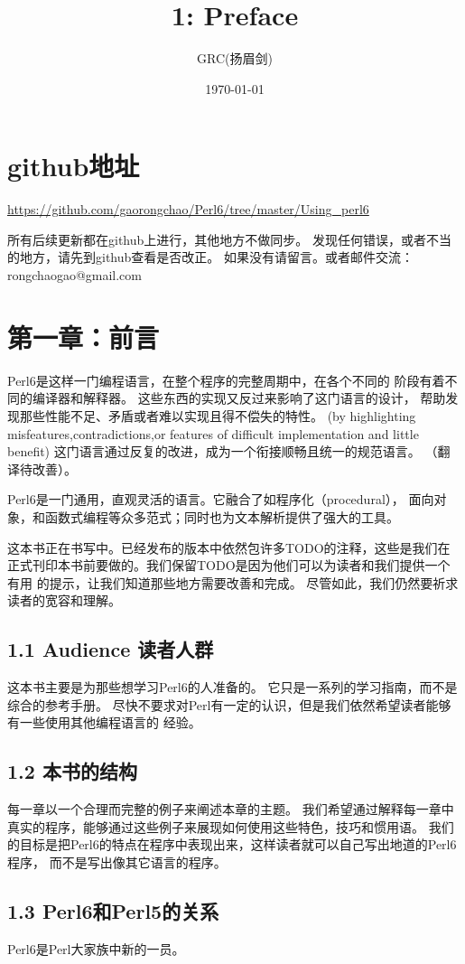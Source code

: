 \documentclass{ctexart}
\title{1: Preface}
\author{GRC(扬眉剑)}
\date{\today}
\begin{document}
\maketitle

\setcounter{tocdepth}{3}
\tableofcontents
\vspace*{1cm}
\section{github地址}
\label{sec-1}

\href{https://github.com/gaorongchao/Perl6/tree/master/Using_perl6}{https://github.com/gaorongchao/Perl6/tree/master/Using\_perl6}

所有后续更新都在github上进行，其他地方不做同步。
发现任何错误，或者不当的地方，请先到github查看是否改正。
如果没有请留言。或者邮件交流：rongchaogao@gmail.com
\section{第一章：前言}
\label{sec-2}

Perl6是这样一门编程语言，在整个程序的完整周期中，在各个不同的
阶段有着不同的编译器和解释器。
这些东西的实现又反过来影响了这门语言的设计，
帮助发现那些性能不足、矛盾或者难以实现且得不偿失的特性。
(by highlighting misfeatures,contradictions,or features
of difficult implementation and little benefit)
这门语言通过反复的改进，成为一个衔接顺畅且统一的规范语言。
（翻译待改善）。

Perl6是一门通用，直观灵活的语言。它融合了如程序化（procedural），
面向对象，和函数式编程等众多范式；同时也为文本解析提供了强大的工具。

这本书正在书写中。已经发布的版本中依然包许多TODO的注释，这些是我们在
正式刊印本书前要做的。我们保留TODO是因为他们可以为读者和我们提供一个有用
的提示，让我们知道那些地方需要改善和完成。
尽管如此，我们仍然要祈求读者的宽容和理解。
\subsection{1.1 Audience 读者人群}
\label{sec-2-1}

这本书主要是为那些想学习Perl6的人准备的。
它只是一系列的学习指南，而不是综合的参考手册。
尽快不要求对Perl有一定的认识，但是我们依然希望读者能够有一些使用其他编程语言的
经验。
\subsection{1.2 本书的结构}
\label{sec-2-2}

每一章以一个合理而完整的例子来阐述本章的主题。
我们希望通过解释每一章中真实的程序，能够通过这些例子来展现如何使用这些特色，技巧和惯用语。
我们的目标是把Perl6的特点在程序中表现出来，这样读者就可以自己写出地道的Perl6程序，
而不是写出像其它语言的程序。
\subsection{1.3 Perl6和Perl5的关系}
\label{sec-2-3}

Perl6是Perl大家族中新的一员。
\end{document}
